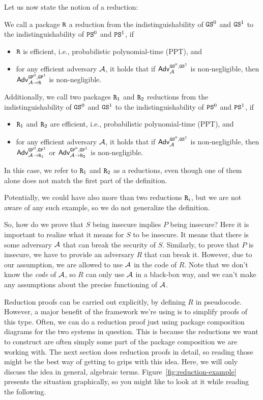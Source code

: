 Let us now state the notion of a reduction:
\begin{definition}[Reduction]
We call a package $\text{\texttt{R}}$ a reduction from the indistinguishability of $\text{\texttt{GS}}^0$ and  $\text{\texttt{GS}}^1$ to the indistinguishability of 
$\text{\texttt{PS}}^0$ and  $\text{\texttt{PS}}^1$, if
\begin{itemize}
\item $\text{\texttt{R}}$ is efficient, i.e., probabilistic polynomial-time (PPT), and
\item for any efficient adversary $\mathcal{A}$, it holds that if $\mathsf{Adv}^{\text{\texttt{GS}}^0,\text{\texttt{GS}}^1}_{\mathcal{A}}$ is non-negligible, then
      $\mathsf{Adv}^{\text{\texttt{GP}}^0,\text{\texttt{GP}}^1}_{\mathcal{A}\rightarrow\text{\texttt{R}}}$ is non-negligible.
\end{itemize}
Additionally, we call two packages $\text{\texttt{R}}_1$ and $\text{\texttt{R}}_2$ reductions from the indistinguishability of $\text{\texttt{GS}}^0$ and  $\text{\texttt{GS}}^1$ to the indistinguishability of 
$\text{\texttt{PS}}^0$ and  $\text{\texttt{PS}}^1$, if
\begin{itemize}
\item $\text{\texttt{R}}_1$ and $\text{\texttt{R}}_2$ are efficient, i.e., probabilistic polynomial-time (PPT), and
\item for any efficient adversary $\mathcal{A}$, it holds that if $\mathsf{Adv}^{\text{\texttt{GS}}^0,\text{\texttt{GS}}^1}_{\mathcal{A}}$ is non-negligible, then
      $\mathsf{Adv}^{\text{\texttt{GP}}^0,\text{\texttt{GP}}^1}_{\mathcal{A}\rightarrow\text{\texttt{R}}_1}$ or $\mathsf{Adv}^{\text{\texttt{GP}}^0,\text{\texttt{GP}}^1}_{\mathcal{A}\rightarrow\text{\texttt{R}}_2}$ is non-negligible.
\end{itemize}
In this case, we refer to $\text{\texttt{R}}_1$ and $\text{\texttt{R}}_2$ as a reductions, even though one of them alone does not match the first
part of the definition.
\end{definition}
Potentially, we could have also more than two reductions $\text{\texttt{R}}_i$, but we are not aware of any such example,
so we do not generalize the definition.


\iffalse
So, how do we prove that $S$ being insecure implies $P$ being insecure? Here it is important to realize what it means for $S$ to be insecure. It means that there is some adversary $\mathcal{A}$ that can break the security of $S$. Similarly, to prove that $P$ is insecure, we have to provide an adversary $R$ that can break it. However, due to our assumption, we are allowed to use $\mathcal{A}$ in the code of $R$. Note that we don't know the \emph{code} of $\mathcal{A}$, so $R$ can only use $\mathcal{A}$ in a black-box way, and we can't make any assumptions about the precise functioning of $\mathcal{A}$.

Reduction proofs can be carried out explicitly, by defining $R$ in pseudocode. However, a major benefit of the framework we're using is to simplify proofs of this type. Often, we can do a reduction proof just using package composition diagrams for the two systems in question. This is because the reductions we want to construct are often simply some part of the package composition we are working with. The next section does reduction proofs in detail, so reading those might be the best way of getting to grips with this idea. Here, we will only discuss the idea in general, algebraic terms. Figure~\ref{fig:reduction-example} presents the situation graphically, so you might like to look at it while reading the following.

